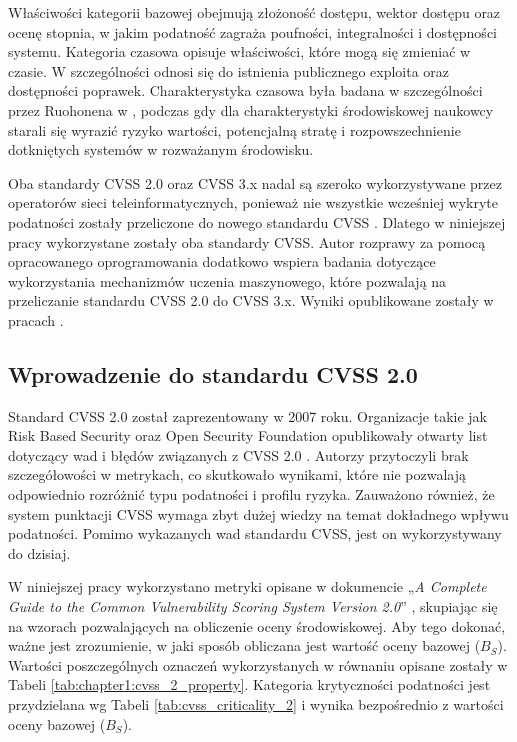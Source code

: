 \bigbreak
Właściwości kategorii bazowej obejmują złożoność dostępu, wektor dostępu oraz ocenę stopnia, w jakim podatność zagraża poufności, integralności i dostępności systemu. Kategoria czasowa opisuje właściwości, które mogą się zmieniać w czasie. W szczególności odnosi się do istnienia publicznego exploita oraz dostępności poprawek. Charakterystyka czasowa była badana w szczególności przez Ruohonena w \cite{cvsspecification}, podczas gdy dla charakterystyki środowiskowej \cite{mell2003overview} naukowcy starali się wyrazić ryzyko wartości, potencjalną stratę i rozpowszechnienie dotkniętych systemów w rozważanym środowisku.

\bigbreak
Oba standardy CVSS 2.0 oraz CVSS 3.x nadal są szeroko wykorzystywane przez operatorów sieci teleinformatycznych, ponieważ nie wszystkie wcześniej wykryte podatności zostały przeliczone do nowego standardu CVSS \cite{fall2019common}. Dlatego w niniejszej pracy wykorzystane zostały oba standardy CVSS. Autor rozprawy za pomocą opracowanego oprogramowania dodatkowo wspiera badania dotyczące wykorzystania mechanizmów uczenia maszynowego, które pozwalają na przeliczanie standardu CVSS 2.0 do CVSS 3.x. Wyniki opublikowane zostały w pracach \cite{Nowak-cldd-2021, Nowa2109Conversion}.

\FloatBarrier

\subsection{Wprowadzenie do standardu CVSS 2.0}
\label{sec:cvss_2_standard}
Standard CVSS 2.0 został zaprezentowany w 2007 roku. Organizacje takie jak Risk Based Security oraz Open Security Foundation opublikowały otwarty list dotyczący wad i błędów związanych z CVSS 2.0 \cite{eiram2013cvssv2}. Autorzy przytoczyli brak szczegółowości w metrykach, co skutkowało wynikami, które nie pozwalają odpowiednio rozróżnić typu podatności i profilu ryzyka. Zauważono również, że system punktacji CVSS wymaga zbyt dużej wiedzy na temat dokładnego wpływu podatności. Pomimo wykazanych wad standardu CVSS, jest on wykorzystywany do dzisiaj.

\bigbreak
W niniejszej pracy wykorzystano metryki opisane w dokumencie „\emph{A Complete Guide to the Common Vulnerability Scoring System Version 2.0}” \cite{cvs2005specification}, skupiając się na wzorach pozwalających na obliczenie oceny środowiskowej. Aby tego dokonać, ważne jest zrozumienie, w jaki sposób obliczana jest wartość oceny bazowej ($B_S$). Wartości poszczególnych oznaczeń wykorzystanych w równaniu opisane zostały w Tabeli \ref{tab:chapter1:cvss_2_property}. Kategoria krytyczności podatności jest przydzielana wg Tabeli \ref{tab:cvss_criticality_2} i wynika bezpośrednio z wartości oceny bazowej ($B_S$).

